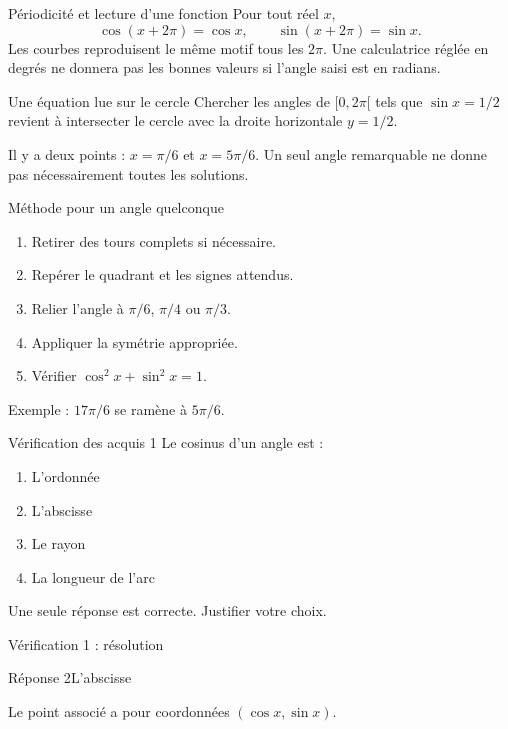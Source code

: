 \documentclass[aspectratio=169,12pt]{beamer}
\begin{document}
\begin{frame}[t,fragile]{Périodicité et lecture d’une fonction}
Pour tout réel $x$,\[\cos(x+2\pi)=\cos x,\qquad\sin(x+2\pi)=\sin x.\] Les courbes reproduisent le même motif tous les $2\pi$. Une calculatrice réglée en degrés ne donnera pas les bonnes valeurs si l’angle saisi est en radians.
\end{frame}
\renewcommand{\slidekind}{MÉTHODE \& EXEMPLE}
\begin{frame}[t,fragile]{Une équation lue sur le cercle}
Chercher les angles de $[0,2\pi[$ tels que $\sin x=1/2$ revient à intersecter le cercle avec la droite horizontale $y=1/2$.\medskip\par Il y a deux points : $x=\pi/6$ et $x=5\pi/6$. Un seul angle remarquable ne donne pas nécessairement toutes les solutions.
\end{frame}
\renewcommand{\slidekind}{MÉTHODE \& EXEMPLE}
\begin{frame}[t,fragile]{Méthode pour un angle quelconque}
\begin{enumerate}\item Retirer des tours complets si nécessaire.\item Repérer le quadrant et les signes attendus.\item Relier l’angle à $\pi/6$, $\pi/4$ ou $\pi/3$.\item Appliquer la symétrie appropriée.\item Vérifier $\cos^2x+\sin^2x=1$.\end{enumerate} Exemple : $17\pi/6$ se ramène à $5\pi/6$.
\end{frame}
\renewcommand{\slidekind}{À VOUS DE JOUER}\begin{frame}[t]{Vérification des acquis 1}
Le cosinus d’un angle est :\begin{enumerate}
\item L’ordonnée
\item L’abscisse
\item Le rayon
\item La longueur de l’arc
\end{enumerate}\medskip Une seule réponse est correcte. Justifier votre choix.\end{frame}
\renewcommand{\slidekind}{COMPRENDRE LA RÉPONSE}\begin{frame}[t]{Vérification 1 : résolution}
\begin{block}{Réponse 2}L’abscisse\end{block}\medskip Le point associé a pour coordonnées $(\cos x,\sin x)$.\end{frame}
\end{document}
